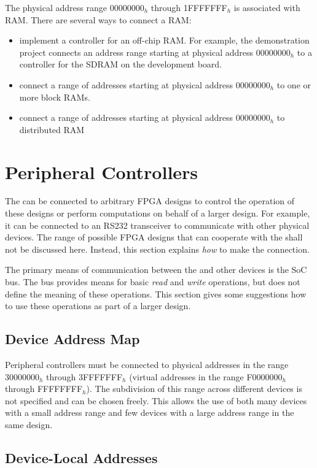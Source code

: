 The physical address range 00000000$_h$ through 1FFFFFFF$_h$ is associated with RAM. There are several ways to connect a RAM:
\begin{itemize}
\item implement a controller for an off-chip RAM. For example, the demonstration project connects an address range starting at physical address 00000000$_h$ to a controller for the SDRAM on the development board.
\item connect a range of addresses starting at physical address 00000000$_h$ to one or more block RAMs.
\item connect a range of addresses starting at physical address 00000000$_h$ to distributed RAM
\end{itemize}

\section{Peripheral Controllers}

The \eco can be connected to arbitrary FPGA designs to control the operation of these designs or perform computations on behalf of a larger design. For example, it can be connected to an RS232 transceiver to communicate with other physical devices. The range of possible FPGA designs that can cooperate with the \eco shall not be discussed here. Instead, this section explains {\it how} to make the connection.

The primary means of communication between the \eco and other devices is the SoC bus. The bus provides means for basic {\it read} and {\it write} operations, but does not define the meaning of these operations. This section gives some suggestions how to use these operations as part of a larger design.

\subsection{Device Address Map}

Peripheral controllers must be connected to physical addresses in the range 30000000$_h$ through 3FFFFFFF$_h$ (virtual addresses in the range F0000000$_h$ through FFFFFFFF$_h$). The subdivision of this range across different devices is not specified and can be chosen freely. This allows the use of both many devices with a small address range and few devices with a large address range in the same design.

\subsection{Device-Local Addresses}

